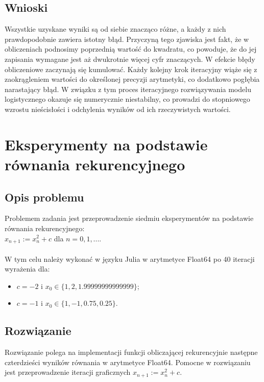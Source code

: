 \documentclass{article}
\begin{document}
\subsection{Wnioski}
Wszystkie uzyskane wyniki są od siebie znacząco różne, a każdy z nich prawdopodobnie zawiera istotny błąd. Przyczyną tego zjawiska jest fakt, że w obliczeniach podnosimy poprzednią wartość do kwadratu, co powoduje, że do jej zapisania wymagane jest aż dwukrotnie więcej cyfr znaczących. W efekcie błędy obliczeniowe zaczynają się kumulować. Każdy kolejny krok iteracyjny wiąże się z zaokrągleniem wartości do określonej precyzji arytmetyki, co dodatkowo pogłębia narastający błąd. W związku z tym proces iteracyjnego rozwiązywania modelu logistycznego okazuje się numerycznie niestabilny, co prowadzi do stopniowego wzrostu nieścisłości i odchylenia wyników od ich rzeczywistych wartości.
\section{Eksperymenty na podstawie równania rekurencyjnego}

\subsection{Opis problemu}
Problemem zadania jest przeprowadzenie siedmiu eksperymentów na podstawie równania rekurencyjnego: \\ $x_{n+1} := x_n^2 + c$ dla $n = 0, 1, ...$. \\ \\W tym celu należy wykonać w języku Julia w arytmetyce Float64 po 40 iteracji wyrażenia dla:
\begin{itemize}
    \item $c = -2$ i $x_0 \in \{1, 2, 1.99999999999999\}$;
    \item $c = -1$ i $x_0 \in \{1, -1, 0.75, 0.25\}$.
\end{itemize}
\subsection{Rozwiązanie}
Rozwiązanie polega na implementacji funkcji obliczającej rekurencyjnie następne czterdzieści wyników równania w arytmetyce Float64. Pomocne w rozwiązaniu jest przeprowadzenie iteracji graficznych $x_{n+1} := x_n^2 + c$.
\end{document}
